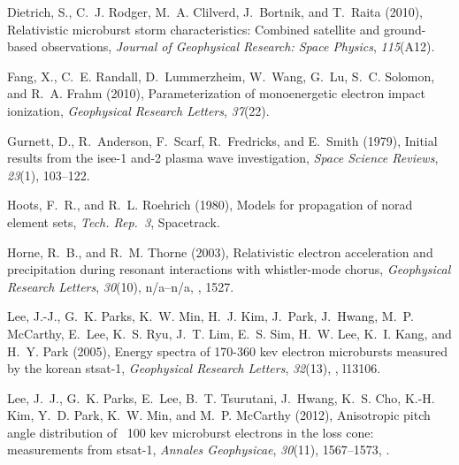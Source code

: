 \documentclass[draft, linenumbers]{agujournal}
\begin{document}
\begin{thebibliography}{35}
Dietrich, S., C.~J. Rodger, M.~A. Clilverd, J.~Bortnik, and T.~Raita (2010),
  Relativistic microburst storm characteristics: Combined satellite and
  ground-based observations, \textit{Journal of Geophysical Research: Space
  Physics}, \textit{115}(A12).

Fang, X., C.~E. Randall, D.~Lummerzheim, W.~Wang, G.~Lu, S.~C. Solomon, and
  R.~A. Frahm (2010), Parameterization of monoenergetic electron impact
  ionization, \textit{Geophysical Research Letters}, \textit{37}(22).

Gurnett, D., R.~Anderson, F.~Scarf, R.~Fredricks, and E.~Smith (1979), Initial
  results from the isee-1 and-2 plasma wave investigation, \textit{Space
  Science Reviews}, \textit{23}(1), 103--122.

Hoots, F.~R., and R.~L. Roehrich (1980), Models for propagation of norad
  element sets, \textit{Tech. Rep.~3}, Spacetrack.

Horne, R.~B., and R.~M. Thorne (2003), Relativistic electron acceleration and
  precipitation during resonant interactions with whistler-mode chorus,
  \textit{Geophysical Research Letters}, \textit{30}(10), n/a--n/a,
  , 1527.

Lee, J.-J., G.~K. Parks, K.~W. Min, H.~J. Kim, J.~Park, J.~Hwang, M.~P.
  McCarthy, E.~Lee, K.~S. Ryu, J.~T. Lim, E.~S. Sim, H.~W. Lee, K.~I. Kang, and
  H.~Y. Park (2005), Energy spectra of 170-360 kev electron microbursts
  measured by the korean stsat-1, \textit{Geophysical Research Letters},
  \textit{32}(13), , l13106.

Lee, J.~J., G.~K. Parks, E.~Lee, B.~T. Tsurutani, J.~Hwang, K.~S. Cho, K.-H.
  Kim, Y.~D. Park, K.~W. Min, and M.~P. McCarthy (2012), Anisotropic pitch
  angle distribution of ~100 kev microburst electrons in the loss cone:
  measurements from stsat-1, \textit{Annales Geophysicae}, \textit{30}(11),
  1567--1573, .


\end{thebibliography}
\end{document}
